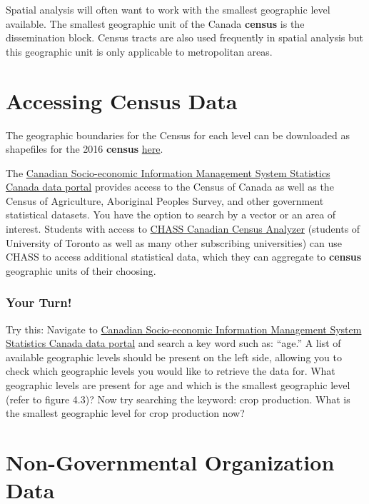 \documentclass[
]{book}
\begin{document}
Spatial analysis will often want to work with the smallest geographic level available. The smallest geographic unit of the Canada \textbf{census} is the dissemination block. Census tracts are also used frequently in spatial analysis but this geographic unit is only applicable to metropolitan areas.

\hypertarget{accessing-census-data}{%
\section{Accessing Census Data}\label{accessing-census-data}}

The geographic boundaries for the Census for each level can be downloaded as shapefiles for the 2016 \textbf{census} \href{https://www12.statcan.gc.ca/census-recensement/2011/geo/bound-limit/bound-limit-2016-eng.cfm}{here}.

The \href{https://www150.statcan.gc.ca/n1/en/type/data}{Canadian Socio-economic Information Management System Statistics Canada data portal} provides access to the Census of Canada as well as the Census of Agriculture, Aboriginal Peoples Survey, and other government statistical datasets. You have the option to search by a vector or an area of interest. Students with access to \href{http://dc1.chass.utoronto.ca/census/index.html}{CHASS Canadian Census Analyzer} (students of University of Toronto as well as many other subscribing universities) can use CHASS to access additional statistical data, which they can aggregate to \textbf{census} geographic units of their choosing.

\hypertarget{your-turn-2}{%
\subsubsection*{Your Turn!}\label{your-turn-2}}

Try this: Navigate to \href{https://www150.statcan.gc.ca/n1/en/type/data}{Canadian Socio-economic Information Management System Statistics Canada data portal} and search a key word such as: ``age.'' A list of available geographic levels should be present on the left side, allowing you to check which geographic levels you would like to retrieve the data for. What geographic levels are present for age and which is the smallest geographic level (refer to figure 4.3)? Now try searching the keyword: crop production. What is the smallest geographic level for crop production now?

\hypertarget{non-governmental-organization-data}{%
\section{Non-Governmental Organization Data}\label{non-governmental-organization-data}}
\end{document}
